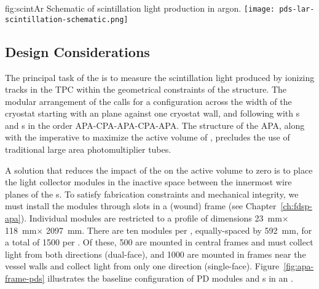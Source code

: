 \begin{dunefigure}{fig:scintAr}
{Schematic of scintillation light production in argon.}
\texttt{[image: pds-lar-scintillation-schematic.png]}
\end{dunefigure}

\subsection{Design Considerations}
\label{sec:fdsp-pd-des-consid}

The principal task of the   is to measure the  scintillation light produced by ionizing tracks in the TPC within the geometrical constraints of the  structure. The modular arrangement of the  calls for a configuration across the width of the cryostat starting with an  plane against one cryostat wall, and following with s and s in the order  APA-CPA-APA-CPA-APA.
The structure of the APA, along with the imperative to maximize the active volume of , precludes the use of traditional large area photomultiplier tubes.  

A solution that reduces the impact of the  on the active volume to zero is to place the light collector modules in the inactive space between the innermost wire planes of the s. To satisfy  fabrication constraints and mechanical integrity, we must install the modules through slots in a (wound)  frame 
(see Chapter~\ref{ch:fdsp-apa}).  
Individual  modules are restricted to a profile of dimensions \SI{23}{mm}$\times$\SI{118}{mm}$\times$ \SI{2097}{mm}.  There are ten  modules per , equally-spaced by \SI{592}{mm}, for a total of \num{1500} per .  Of these, \num{500} are mounted in central  frames and must collect light from both directions (dual-face), and \num{1000} are mounted in frames  near the vessel walls and collect light from only one direction (single-face).
Figure~\ref{fig:apa-frame-pds} illustrates the baseline configuration of PD modules and s in an . 

